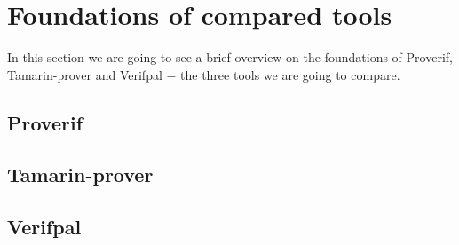 
\section{Foundations of compared tools}
\label{section:foundations-of-compared-tools}

In this section we are going to see a brief overview on the foundations of Proverif, Tamarin-prover and Verifpal $-$ the three tools we are going to compare.

\subsection{Proverif}

\subsection{Tamarin-prover}

\subsection{Verifpal}